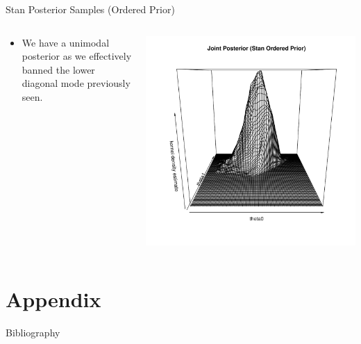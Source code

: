 \documentclass[dvipdfmx,bigger,aspectratio=169]{beamer}
\begin{document}
\begin{frame}[label={sec:org88e18f5}]{Stan Posterior Samples (Ordered Prior)}
\begin{columns}
\begin{column}{0.50\columnwidth}
\begin{itemize}
\item We have a unimodal posterior as we effectively banned the lower diagonal mode previously seen.
\end{itemize}
\end{column}

\begin{column}{0.50\columnwidth}
\scriptsize
\begin{center}
\includegraphics[page=1,keepaspectratio,width=\textwidth,height=\textheight]{./source/figure_stan_ordered.pdf}
\end{center}
\normalsize
\end{column}
\end{columns}
\end{frame}

\section{Appendix}
\label{sec:org5fae506}
\appendix
\begin{frame}[allowframebreaks,label=,t]{Bibliography}
\tiny

\renewcommand{\section}[2]{}



\end{frame}
\end{document}
